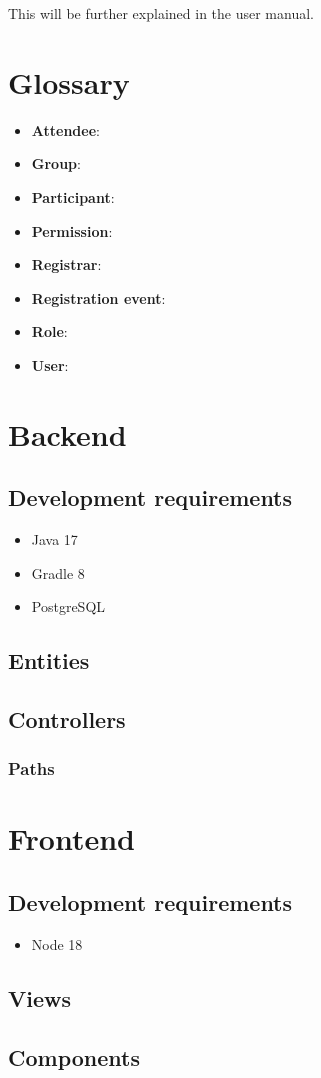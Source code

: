 \documentclass[12pt, letterpaper]{report}
\newcommand{\bolditem}[1]{\item \textbf{#1}}
\begin{document}
This will be further explained in the user manual.

\chapter{Glossary}

\begin{itemize}
    \bolditem{Attendee}:
    \bolditem{Group}:
    \bolditem{Participant}:
    \bolditem{Permission}:
    \bolditem{Registrar}:
    \bolditem{Registration event}:
    \bolditem{Role}:
    \bolditem{User}:
\end{itemize}

\chapter{Backend}

\section{Development requirements}

\begin{itemize}
    \item Java 17
    \item Gradle 8
    \item PostgreSQL
\end{itemize}

\section{Entities}

\section{Controllers}

\subsection{Paths}

\chapter{Frontend}

\section{Development requirements}

\begin{itemize}
    \item Node 18
\end{itemize}

\section{Views}

\section{Components}
\end{document}
